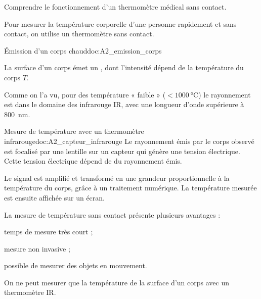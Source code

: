 \tetePremStssLumi



\begin{objectifs}
  \item Comprendre le fonctionnement d'un thermomètre médical sans contact.
\end{objectifs}

\begin{contexte}
  Pour mesurer la température corporelle d'une personne rapidement et sans contact, on utilise un thermomètre sans contact.
  
\end{contexte}


\begin{doc}{Émission d'un corps chaud}{doc:A2_emission_corps}
  \begin{importants}
    La surface d'un corps émet un , dont l'intensité dépend de la température du corps $T$.
  \end{importants}

  Comme on l'a vu, pour des température « faible » ($< \qty{1000}{\degreeCelsius}$) le rayonnement est dans le domaine des infrarouge IR, avec une longueur d'onde supérieure à \qty{800}{\nm}.
\end{doc}

\begin{doc}{Mesure de température avec un thermomètre infrarouge}{doc:A2_capteur_infrarouge}
  Le rayonnement émis par le corps observé est focalisé par une lentille sur un capteur qui génère une tension électrique.
  Cette tension électrique dépend de  du rayonnement émis.
  
  Le signal est amplifié et transformé en une grandeur proportionnelle à la température du corps, grâce à un traitement numérique.
  La température mesurée est ensuite affichée sur un écran.

  La mesure de température sans contact présente plusieurs avantages :
  \begin{listePoints}
    \item temps de mesure très court ;
    \item mesure non invasive ;
    \item possible de mesurer des objets en mouvement.
  \end{listePoints}

  \begin{center}
  \end{center}

  On ne peut mesurer que la température de la surface d'un corps avec un thermomètre IR.
\end{doc}


